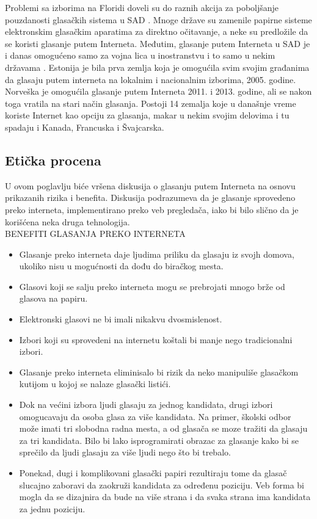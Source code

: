 \documentclass[a4paper]{article}
\theoremstyle{break}
\begin{document}
{Problemi sa izborima na Floridi doveli su do raznih akcija za poboljšanje pouzdanosti glasačkih sistema u SAD \cite{knjiga}. Mnoge države su zamenile papirne sisteme elektronskim glasačkim aparatima za direktno očitavanje, a neke su predložile da se koristi glasanje putem Interneta.
Međutim, glasanje putem Interneta u SAD je i danas omogućeno samo za vojna lica u inostranstvu i to samo u nekim državama \cite{i_voting}. Estonija je bila prva zemlja koja je omogućila svim svojim građanima da glasaju putem interneta na lokalnim i nacionalnim izborima, 2005. godine. 
Norveška je omogućila glasanje putem Interneta 2011. i 2013. godine, ali se nakon toga vratila na stari način glasanja. Postoji 14 zemalja koje u današnje vreme koriste Internet kao opciju za glasanja, makar u nekim svojim delovima i tu spadaju i Kanada, Francuska i Švajcarska.

\subsection{Etička procena}
\label{subsec:Eticka procena}

U ovom poglavlju biće vršena diskusija o glasanju putem Interneta na osnovu prikazanih rizika i benefita. Diskusija podrazumeva da je glasanje sprovedeno preko interneta, implementirano preko veb pregledača, iako bi bilo slično da je korišćena neka druga tehnologija.\\


\noindent BENEFITI GLASANJA PREKO INTERNETA
\begin{itemize}
\item Glasanje preko interneta daje ljudima priliku da glasaju iz svojh domova, ukoliko nisu u mogućnosti da dođu do biračkog mesta.
\item Glasovi koji se salju preko interneta mogu se prebrojati mnogo brže od glasova na papiru.
\item Elektronski glasovi ne bi imali nikakvu dvosmislenost.
\item Izbori koji su sprovedeni na internetu koštali bi manje nego tradicionalni izbori.
\item Glasanje preko interneta eliminisalo bi rizik da neko manipuliše glasačkom kutijom u kojoj se nalaze glasački listići.
\item Dok na većini izbora ljudi glasaju za jednog kandidata, drugi izbori omogucavaju da osoba glasa za više kandidata. Na primer, školski odbor može imati tri slobodna radna mesta, a od glasača se moze tražiti da glasaju za tri kandidata. Bilo bi lako isprogramirati obrazac za glasanje kako bi se sprečilo da ljudi glasaju za više ljudi nego što bi trebalo.
\item Ponekad, dugi i komplikovani glasački papiri rezultiraju tome da glasač slucajno zaboravi da zaokruži kandidata za određenu poziciju. Veb forma bi mogla da se dizajnira da bude na više strana i da svaka strana ima kandidata za jednu poziciju.
\end{itemize}


}
\end{document}
